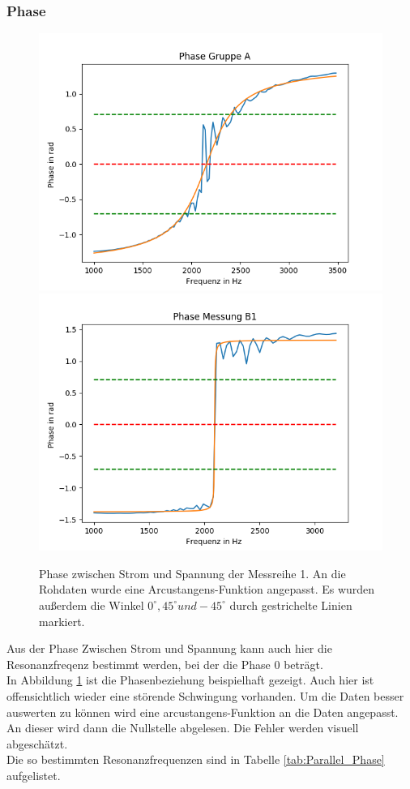 \documentclass[12pt,a4paper]{article}
\begin{document}
\subsubsection{Phase}
\begin{figure}
\includegraphics[scale=1]{Bilder/Parallel_Phase.png}
\includegraphics[scale=1]{Bilder/Parallel_PhaseB.png}
\caption{Phase zwischen Strom und Spannung der Messreihe 1. An die Rohdaten wurde eine Arcustangens-Funktion angepasst. Es wurden außerdem die Winkel $0^\circ, 45^\circ und -45^\circ$ durch gestrichelte Linien markiert.}
\label{fig:parallel_Phase}
\end{figure}

Aus der Phase Zwischen Strom und Spannung kann auch hier die Resonanzfreqenz bestimmt werden, bei der die Phase 0 beträgt.\\
In Abbildung \ref{fig:parallel_Phase} ist die Phasenbeziehung beispielhaft gezeigt. Auch hier ist offensichtlich wieder eine störende Schwingung vorhanden. Um die Daten besser auswerten zu können wird eine arcustangens-Funktion an die Daten angepasst. An dieser wird dann die Nullstelle abgelesen.
Die Fehler werden visuell abgeschätzt.\\
Die so bestimmten Resonanzfrequenzen sind in Tabelle  \ref{tab:Parallel_Phase} aufgelistet.
\end{document}
